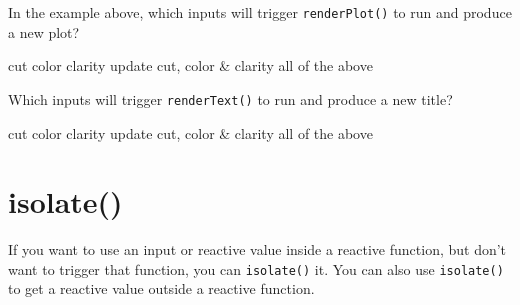 \documentclass[
  oneside]{book}
\begin{document}
In the example above, which inputs will trigger \texttt{renderPlot}\texttt{()} to run and produce a new plot?

cut color clarity update cut, color \& clarity all of the above

Which inputs will trigger \texttt{renderText}\texttt{()} to run and produce a new title?

cut color clarity update cut, color \& clarity all of the above

\hypertarget{isolate}{%
\section{isolate()}\label{isolate}}

If you want to use an input or reactive value inside a reactive function, but don't want to trigger that function, you can \texttt{isolate}\texttt{()} it. You can also use \texttt{isolate}\texttt{()} to get a reactive value outside a reactive function.
\end{document}

